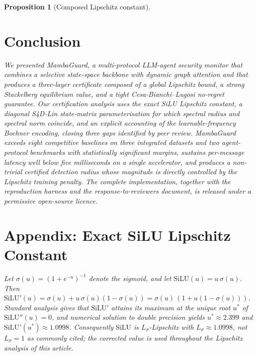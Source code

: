 \documentclass{ieeeaccess}
\newtheorem{proposition}[theorem]{Proposition}
\begin{document}
\begin{proposition}[Composed Lipschitz constant]
\section{Conclusion}
\label{sec:conclusion}
We presented MambaGuard, a multi-protocol LLM-agent security monitor that combines a selective state-space backbone with dynamic graph attention and that produces a three-layer certificate composed of a global Lipschitz bound, a strong Stackelberg equilibrium value, and a tight Cesa-Bianchi--Lugosi no-regret guarantee. Our certification analysis uses the exact SiLU Lipschitz constant, a diagonal S4D-Lin state-matrix parameterisation for which spectral radius and spectral norm coincide, and an explicit accounting of the learnable-frequency Bochner encoding, closing three gaps identified by peer review. MambaGuard exceeds eight competitive baselines on three integrated datasets and two agent-protocol benchmarks with statistically significant margins, sustains per-message latency well below five milliseconds on a single accelerator, and produces a non-trivial certified detection radius whose magnitude is directly controlled by the Lipschitz training penalty. The complete implementation, together with the reproduction harness and the response-to-reviewers document, is released under a permissive open-source licence.

\section*{Appendix: Exact SiLU Lipschitz Constant}
\label{app:silu}
Let $\sigma(u)=(1+e^{-u})^{-1}$ denote the sigmoid, and let $\mathrm{SiLU}(u)=u\,\sigma(u)$. Then $\mathrm{SiLU}'(u)=\sigma(u)+u\,\sigma(u)(1-\sigma(u))=\sigma(u)\,(1+u(1-\sigma(u)))$. Standard analysis gives that $\mathrm{SiLU}'$ attains its maximum at the unique root $u^{*}$ of $\mathrm{SiLU}''(u)=0$, and numerical solution to double precision yields $u^{*}\approx 2.399$ and $\mathrm{SiLU}'(u^{*})\approx 1.0998$. Consequently $\mathrm{SiLU}$ is $L_{\sigma}$-Lipschitz with $L_{\sigma}\approx 1.0998$, not $L_{\sigma}=1$ as commonly cited; the corrected value is used throughout the Lipschitz analysis of this article.



\end{proposition}
\end{document}
